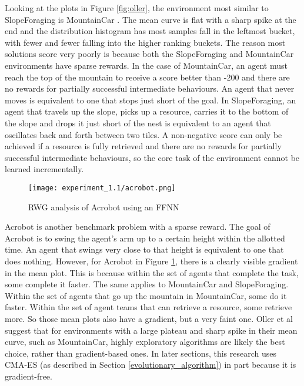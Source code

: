 \documentclass[12pt]{article}
\begin{document}
Looking at the plots in Figure \ref{fig:oller}, the environment most similar to SlopeForaging is MountainCar \cite{MountainCar}.
The mean curve is flat with a sharp spike at the end and the distribution histogram has most samples fall in the leftmost bucket, with fewer and fewer falling into the higher ranking buckets.
The reason most solutions score very poorly is because both the SlopeForaging and MountainCar environments have sparse rewards.
In the case of MountainCar, an agent must reach the top of the mountain to receive a score better than -200 and there are no rewards for partially successful intermediate behaviours. 
An agent that never moves is equivalent to one that stops just short of the goal. 
In SlopeForaging, an agent that travels up the slope, picks up a resource, carries it to the bottom of the slope and drops it just short of the nest is equivalent to an agent that oscillates back and forth between two tiles. 
A non-negative score can only be achieved if a resource is fully retrieved and there are no rewards for partially successful intermediate behaviours, so the core task of the environment cannot be learned incrementally.\\

\begin{figure}
	\centering
	\texttt{[image: experiment\_1.1/acrobot.png]}
	\caption{RWG analysis of Acrobot using an FFNN}
	\label{fig:acrobot}
\end{figure}

Acrobot is another benchmark problem with a sparse reward.
The goal of Acrobot is to swing the agent's arm up to a certain height within the allotted time.
An agent that swings very close to that height is equivalent to one that does nothing.
However, for Acrobot in Figure \ref{fig:acrobot}, there is a clearly visible gradient in the mean plot.
This is because within the set of agents that complete the task, some complete it faster.
The same applies to MountainCar and SlopeForaging.
Within the set of agents that go up the mountain in MountainCar, some do it faster.
Within the set of agent teams that can retrieve a resource, some retrieve more.
So those mean plots also have a gradient, but a very faint one.
Oller et al suggest that for environments with a large plateau and sharp spike in their mean curve, such as MountainCar, highly exploratory algorithms are likely the best choice, rather than gradient-based ones.
In later sections, this research uses CMA-ES (as described in Section \ref{evolutionary_algorithm}) in part because it is gradient-free.\\
\end{document}
